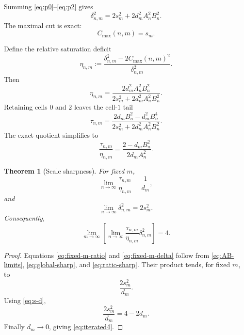 \documentclass[11pt]{article}
\newtheorem{theorem}{Theorem}[section]
\newcommand{\cmax}{C_{\max}}
\newcommand{\dd}{\delta}
\newcommand{\etaq}{\eta}
\newcommand{\tauq}{\tau}
\begin{document}
Summing \eqref{eq:p0}--\eqref{eq:p2} gives
\begin{equation}\label{eq:global-sharp}
  \boxed{
  \dd_{n,m}^2
  =
  2s_m^2+
  2d_m^2A_n^2B_n^2.
  }
\end{equation}
The maximal cut is exact:
\begin{equation}\label{eq:cmax-sharp}
  \boxed{
  \cmax(n,m)=s_m.
  }
\end{equation}

Define the relative saturation deficit
\[
  \etaq_{n,m}
  :=
  \frac{\dd_{n,m}^2-2\cmax(n,m)^2}{\dd_{n,m}^2}.
\]
Then
\begin{equation}\label{eq:eta-sharp}
  \boxed{
  \etaq_{n,m}
  =
  \frac{
    2d_m^2A_n^2B_n^2
  }{
    2s_m^2+2d_m^2A_n^2B_n^2
  }.
  }
\end{equation}
Retaining cells $0$ and $2$ leaves the cell-$1$ tail
\begin{equation}\label{eq:tau-sharp}
  \tauq_{n,m}
  =
  \frac{
    2d_mB_n^2-d_m^2B_n^4
  }{
    2s_m^2+2d_m^2A_n^2B_n^2
  }.
\end{equation}
The exact quotient simplifies to
\begin{equation}\label{eq:ratio-sharp}
  \boxed{
  \frac{\tauq_{n,m}}{\etaq_{n,m}}
  =
  \frac{2-d_mB_n^2}{2d_mA_n^2}.
  }
\end{equation}

\begin{theorem}[Scale sharpness]\label{thm:scale-sharp}
For fixed $m$,
\begin{equation}\label{eq:fixed-m-ratio}
  \lim_{n\to\infty}
  \frac{\tauq_{n,m}}{\etaq_{n,m}}
  =
  \frac1{d_m},
\end{equation}
and
\begin{equation}\label{eq:fixed-m-delta}
  \lim_{n\to\infty}\dd_{n,m}^2=2s_m^2.
\end{equation}
Consequently,
\begin{equation}\label{eq:iterated4}
  \boxed{
  \lim_{m\to\infty}
  \left[
    \lim_{n\to\infty}
    \frac{\tauq_{n,m}}{\etaq_{n,m}}
    \dd_{n,m}^2
  \right]
  =4.
  }
\end{equation}
\end{theorem}

\begin{proof}
Equations \eqref{eq:fixed-m-ratio} and \eqref{eq:fixed-m-delta} follow from
\eqref{eq:AB-limits}, \eqref{eq:global-sharp}, and
\eqref{eq:ratio-sharp}.  Their product tends, for fixed $m$, to
\[
  \frac{2s_m^2}{d_m}.
\]
Using \eqref{eq:s-d},
\[
  \frac{2s_m^2}{d_m}
  =
  4-2d_m.
\]
Finally $d_m\to0$, giving \eqref{eq:iterated4}.
\end{proof}
\end{document}
